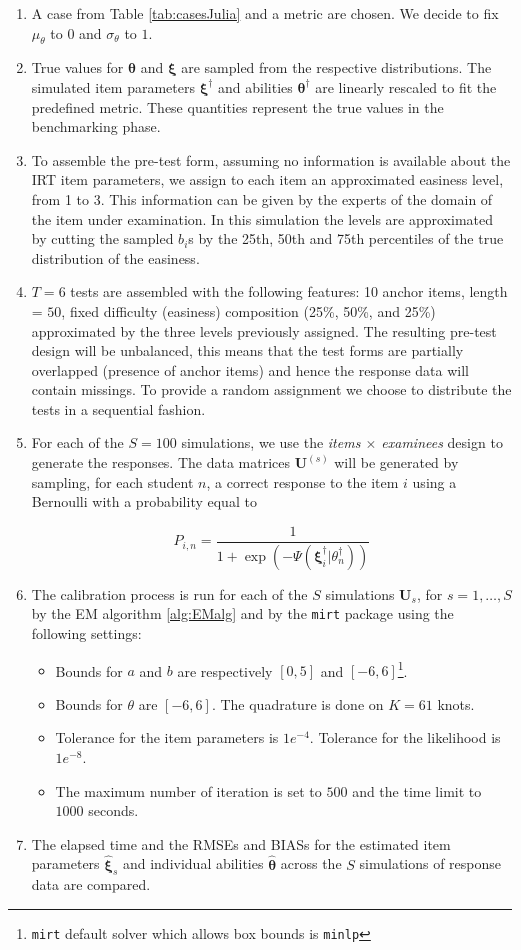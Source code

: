 \begin{enumerate}
	\item A case from Table \ref{tab:casesJulia} and a metric are chosen. We decide to fix $\mu_\theta$ to $0$ and $\sigma_\theta$ to $1$.
	\item True values for $\boldsymbol\theta$ and $\boldsymbol{\xi}$ are sampled from the respective distributions. The simulated item parameters $\boldsymbol{\xi}^\dagger$ and abilities $\boldsymbol\theta^\dagger$ are linearly rescaled to fit the predefined metric. These quantities represent the true values in the benchmarking phase.
	\item To assemble the pre-test form, assuming no information is available about the IRT item parameters, we assign to each item an approximated easiness level, from 1 to 3. This information can be given by the experts of the domain of the item under examination. In this simulation the levels are approximated by cutting the sampled $b_i$s by the 25th, 50th and 75th percentiles of the true distribution of the easiness.
	\item $T=6$ tests are assembled with the following features: 10 anchor items, length = $50$, fixed difficulty (easiness) composition (25\%, 50\%, and 25\%) approximated by the three levels previously assigned. 
	The resulting pre-test design will be unbalanced, this means that the test forms are partially overlapped (presence of anchor items) and hence the response data will contain missings. To provide a random assignment we choose to distribute the tests in a sequential fashion.
	\item For each of the $S=100$ simulations, we use the \emph{items $\times$ examinees} design to generate the responses.
	The data matrices $\mathbf{U}^{(s)}$ will be generated by sampling, for each student $n$, a correct response to the item $i$ using a Bernoulli with a probability equal to
	
	\[P_{i,n}=\frac{1}{1+\exp{(-\Psi(\boldsymbol{\xi}_i^\dagger|\theta_n^\dagger))}} \]
	
	\item The calibration process is run for each of the $S$ simulations $\mathbf{U}_s$, for $s=1,\ldots,S$ by the EM algorithm \ref{alg:EMalg} and by the \texttt{mirt} package using the following settings:
	\begin{itemize}
		\item Bounds for $a$ and $b$ are respectively $[0,5]$ and $[-6,6]$\footnote{\texttt{mirt} default solver which allows box bounds is \texttt{minlp}}. 
		\item Bounds for $\theta$ are $[-6,6]$. The quadrature is done on $K=61$ knots.
		\item Tolerance for the item parameters is $1e^{-4}$. Tolerance for the likelihood is $1e^{-8}$.
		\item The maximum number of iteration is set to $500$ and the time limit to $1000$ seconds.
	\end{itemize}
	\item The elapsed time and the RMSEs and BIASs for the estimated item parameters $\hat{\boldsymbol{\xi}}_s$ and individual abilities $\boldsymbol{\hat{\theta}}$ across the $S$ simulations of response data are compared.
	

\end{enumerate}
